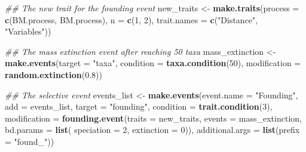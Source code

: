 \documentclass[]{book}
\newenvironment{Shaded}{\begin{snugshade}}{\end{snugshade}}
\newcommand{\CommentTok}[1]{\textcolor[rgb]{0.56,0.35,0.01}{\textit{#1}}}
\newcommand{\DataTypeTok}[1]{\textcolor[rgb]{0.13,0.29,0.53}{#1}}
\newcommand{\DecValTok}[1]{\textcolor[rgb]{0.00,0.00,0.81}{#1}}
\newcommand{\FloatTok}[1]{\textcolor[rgb]{0.00,0.00,0.81}{#1}}
\newcommand{\KeywordTok}[1]{\textcolor[rgb]{0.13,0.29,0.53}{\textbf{#1}}}
\newcommand{\NormalTok}[1]{#1}
\newcommand{\StringTok}[1]{\textcolor[rgb]{0.31,0.60,0.02}{#1}}
\begin{document}
\begin{Shaded}
\begin{Highlighting}[]
\CommentTok{## The new trait for the founding event}
\NormalTok{new_traits <-}\StringTok{ }\KeywordTok{make.traits}\NormalTok{(}\DataTypeTok{process =} \KeywordTok{c}\NormalTok{(BM.process, BM.process), }\DataTypeTok{n =} \KeywordTok{c}\NormalTok{(}\DecValTok{1}\NormalTok{, }\DecValTok{2}\NormalTok{),}
                          \DataTypeTok{trait.names =} \KeywordTok{c}\NormalTok{(}\StringTok{"Distance"}\NormalTok{, }\StringTok{"Variables"}\NormalTok{))}

\CommentTok{## The mass extinction event after reaching 50 taxa}
\NormalTok{mass_extinction <-}\StringTok{ }\KeywordTok{make.events}\NormalTok{(}\DataTypeTok{target       =} \StringTok{"taxa"}\NormalTok{,}
                               \DataTypeTok{condition    =} \KeywordTok{taxa.condition}\NormalTok{(}\DecValTok{50}\NormalTok{),}
                               \DataTypeTok{modification =} \KeywordTok{random.extinction}\NormalTok{(}\FloatTok{0.8}\NormalTok{))}
\end{Highlighting}
\end{Shaded}

\begin{Shaded}
\begin{Highlighting}[]
\CommentTok{## The selective event}
\NormalTok{events_list <-}\StringTok{ }\KeywordTok{make.events}\NormalTok{(}\DataTypeTok{event.name   =} \StringTok{"Founding"}\NormalTok{, }
                           \DataTypeTok{add          =}\NormalTok{ events_list,}
                           \DataTypeTok{target       =} \StringTok{"founding"}\NormalTok{,}
                           \DataTypeTok{condition    =} \KeywordTok{trait.condition}\NormalTok{(}\DecValTok{3}\NormalTok{),}
                           \DataTypeTok{modification =} \KeywordTok{founding.event}\NormalTok{(}\DataTypeTok{traits    =}\NormalTok{ new_traits,}
                                                         \DataTypeTok{events    =}\NormalTok{ mass_extinction,}
                                                         \DataTypeTok{bd.params =} \KeywordTok{list}\NormalTok{(}
                                                            \DataTypeTok{speciation =} \DecValTok{2}\NormalTok{,}
                                                            \DataTypeTok{extinction =} \DecValTok{0}\NormalTok{)),}
                           \DataTypeTok{additional.args =} \KeywordTok{list}\NormalTok{(}\DataTypeTok{prefix =} \StringTok{"found_"}\NormalTok{))}
\end{Highlighting}
\end{Shaded}
\end{document}
